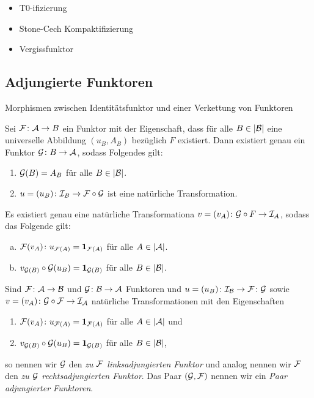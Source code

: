 \begin{ex}
  \begin{itemize}
    \item T0-ifizierung
    \item Stone-Cech Kompaktifizierung
    \item Vergissfunktor
  \end{itemize}
\end{ex}

\begin{defn}
  
\end{defn}

\subsection{Adjungierte Funktoren}

Morphismen zwischen Identitätsfunktor und einer Verkettung von Funktoren

\begin{thm}
  Sei $\mathcal{F} \colon \mathcal{A} \to B$ ein Funktor mit der Eigenschaft, dass für alle $B \in |\mathcal{B}|$ eine universelle Abbildung $(u_B, A_B)$ bezüglich $F$ existiert.
  Dann existiert genau ein Funktor $\mathcal{G} \colon B \to \mathcal{A}$, sodass Folgendes gilt:
  \begin{enumerate}[(1)]
    \item $\mathcal{G}(B) = A_B$ für alle $B \in |\mathcal{B}|$.
    \item $u = (u_B) \colon \mathcal{I}_B \to \mathcal{F} \circ \mathcal{G}$ ist eine natürliche Transformation.
  \end{enumerate}
\end{thm}

\begin{kor}
  Es existiert genau eine natürliche Transformationa $v = (v_A) \colon \mathcal{G} \circ F \to \mathcal{I}_A$, sodass das Folgende gilt:
  \begin{enumerate}[(a)]
    \item $\mathcal{F}(v_A) \colon u_{\mathcal{F}(A)} = \mathbf{1}_{\mathcal{F}(A)}$ für alle $A \in |\mathcal{A}|$.
    \item $v_{\mathcal{G}(B)} \circ \mathcal{G}(u_B) = \mathbf{1}_{\mathcal{G}(B)}$ für alle $B \in |\mathcal{B}|$.
  \end{enumerate}
\end{kor}

\begin{defn}
  Sind $\mathcal{F} \colon \mathcal{A} \to \mathcal{B}$ und $\mathcal{G} \colon \mathcal{B} \to \mathcal{A}$ Funktoren und $u = (u_B) \colon \mathcal{I}_{\mathcal{B}} \to \mathcal{F} \colon \mathcal{G}$ sowie $v = (v_A) \colon \mathcal{G} \circ \mathcal{F} \to \mathcal{I}_{\mathcal{A}}$ natürliche Transformationen mit den Eigenschaften
  \begin{enumerate}[(1)]
    \item $\mathcal{F}(v_A) \colon u_{\mathcal{F}(A)} = \mathbf{1}_{\mathcal{F}(A)}$ für alle $A \in |\mathcal{A}|$ und
    \item $v_{\mathcal{G}(B)} \circ \mathcal{G}(u_B) = \mathbf{1}_{\mathcal{G}(B)}$ für alle $B \in |\mathcal{B}|$,
  \end{enumerate}
  so nennen wir $\mathcal{G}$ den \emph{zu $\mathcal{F}$ linksadjungierten Funktor} und analog nennen wir $\mathcal{F}$ den \emph{zu $\mathcal{G}$ rechtsadjungierten Funktor}.
  Das Paar $(\mathcal{G}, \mathcal{F})$ nennen wir ein \emph{Paar adjungierter Funktoren}.
\end{defn}

